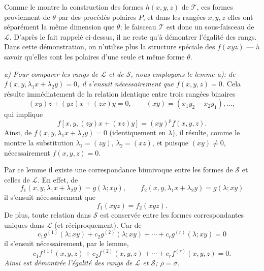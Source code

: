Comme le montre la construction des formes $h(x,y,z)$ de $\mathcal T$, ces formes proviennent de $\theta$ par des procédés polaires $P$, et dans les rangées $x,y,z$ elles ont séparément la même dimension que $\theta$; le faisceau $\mathcal T$ est donc un sous-faisceau de $\mathcal L$. D'après le fait rappelé ci-dessus, il ne reste qu'à démontrer l'égalité des rangs. Dans cette démonstration, on n'utilise plus la structure spéciale des $f(xyz)$ --- à savoir qu'elles sont les polaires d'une seule et même forme $\theta$.

\emph{a) Pour comparer les rangs de $\mathcal L$ et de $\mathcal S$, nous employons le lemme a): de $f(x,y,\lambda_1x+\lambda_2y)=0$, il s'ensuit nécessairement que $f(x,y,z)=0$.} Cela résulte immédiatement de la relation identique entre trois rangées binaires
\[
  (xy)z+(yz)x+(zx)y=0,
  \qquad (xy)=(x_1y_2-x_2y_1),\ldots,
\]
qui implique
\[
  f[x,y,(zy)x+(xz)y]=(xy)^p f(x,y,z).
\]
Ainsi, de $f(x,y,\lambda_1x+\lambda_2y)=0$ (identiquement en $\lambda$), il résulte, comme le montre la substitution $\lambda_1=(zy)$, $\lambda_2=(xz)$, et puisque $(xy)\ne0$, nécessairement $f(x,y,z)=0$.

Par ce lemme il existe une correspondance biunivoque entre les formes de $\mathcal S$ et celles de $\mathcal L$. En effet, de
\[
  f_1(x,y,\lambda_1x+\lambda_2y)=g(\lambda;xy),\qquad
  f_2(x,y,\lambda_1x+\lambda_2y)=g(\lambda;xy)
\]
il s'ensuit nécessairement que
\[
  f_1(xyz)=f_2(xyz).
\]
De plus, toute relation dans $\mathcal S$ est conservée entre les formes correspondantes uniques dans $\mathcal L$ (et réciproquement). Car de
\[
  c_1g^{(1)}(\lambda;xy)+c_2g^{(2)}(\lambda;xy)+\cdots+c_rg^{(r)}(\lambda;xy)=0
\]
il s'ensuit nécessairement, par le lemme,
\[
  c_1f^{(1)}(x,y,z)+c_2f^{(2)}(x,y,z)+\cdots+c_rf^{(r)}(x,y,z)=0.
\]
\emph{Ainsi est démontrée l'égalité des rangs de $\mathcal L$ et $\mathcal S$; $\rho=\sigma$.}

